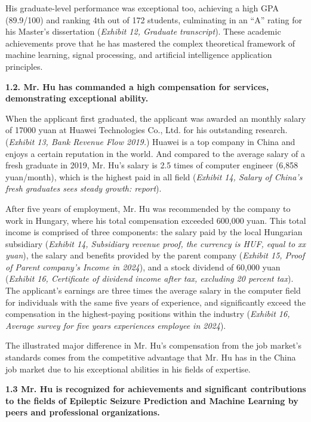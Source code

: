 \documentclass{article}
\begin{document}
His graduate-level performance was exceptional too, achieving a high GPA (89.9/100) and ranking 4th out of 172 students, culminating in an “A” rating for his Master’s dissertation ({\it Exhibit 12, Graduate transcript}). These academic achievements prove that he has mastered the complex theoretical framework of machine learning, signal processing, and artificial intelligence application principles.

{\bf 1.2. Mr. Hu has commanded a high compensation for services, demonstrating exceptional ability. }

When the applicant first graduated, the applicant was awarded an monthly salary of 17000 yuan at Huawei Technologies Co., Ltd. for his outstanding research. ({\it Exhibit 13, Bank Revenue Flow 2019.}) Huawei is a top company in China and enjoys a certain reputation in the world. And compared to the average salary of a fresh graduate in 2019, Mr. Hu's salary is 2.5 times of computer engineer (6,858 yuan/month), which is the highest paid in all field ({\it Exhibit 14, Salary of China's fresh graduates sees steady growth: report}).

After five years of employment, Mr. Hu was recommended by the company to work in Hungary, where his total compensation exceeded 600,000 yuan. This total income is comprised of three components: the salary paid by the local Hungarian subsidiary  ({\it Exhibit 14, Subsidiary revenue proof, the currency is HUF, equal to xx yuan}), the salary and benefits provided by the parent company ({\it Exhibit 15, Proof of Parent company's Income in 2024}), and a stock dividend of 60,000 yuan ({\it Exhibit 16, Certificate of dividend income after tax, excluding 20 percent tax}). The applicant's earnings are three times the average salary in the computer field for individuals with the same five years of experience, and significantly exceed the compensation in the highest-paying positions within the industry ({\it Exhibit 16, Average survey for five years experiences employee in 2024}).

The illustrated major difference in Mr. Hu's compensation from the job market's standards comes from the competitive advantage that Mr. Hu has in the China job market due to his exceptional abilities in his fields of expertise. 

{\bf 1.3 Mr. Hu is recognized for achievements and significant contributions to the fields of Epileptic Seizure Prediction and Machine Learning by peers and professional organizations. }
\end{document}
